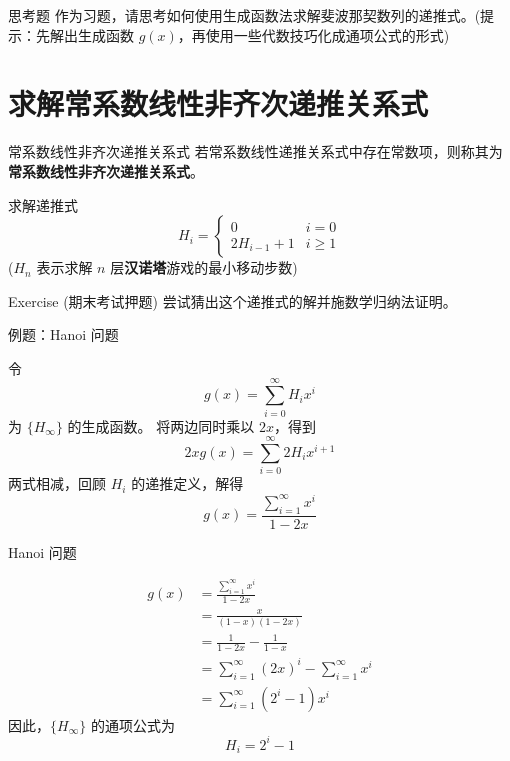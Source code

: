 \documentclass{beamer}
\begin{document}
\begin{frame}{思考题}
    作为习题，请思考如何使用生成函数法求解斐波那契数列的递推式。(提示：先解出生成函数 $g(x)$，再使用一些代数技巧化成通项公式的形式)
\end{frame}

\section{求解常系数线性非齐次递推关系式}

\begin{frame}{常系数线性非齐次递推关系式}
    若常系数线性递推关系式中存在常数项，则称其为\textbf{常系数线性非齐次递推关系式}。
    \pause
    \begin{example}[Hanoi 问题]
        求解递推式
        \begin{displaymath}
            H_i = \begin{cases} 
                0 & i=0\\
                2H_{i-1} + 1 & i\geqslant 1
              \end{cases}
        \end{displaymath}
        ($H_n$ 表示求解 $n$ 层\textbf{汉诺塔}游戏的最小移动步数)
    \end{example}
    \pause
    \begin{block}{Exercise (期末考试押题)}
        尝试猜出这个递推式的解并施数学归纳法证明。
    \end{block}
\end{frame}

\begin{frame}{例题：Hanoi 问题}
    \begin{solution}
        令 
        $$
        g(x) = \sum_{i=0}^\infty H_ix^i
        $$ 
        为 $\{H_\infty\}$ 的生成函数。
        \pause
        将两边同时乘以 $2x$，得到
        $$
        2xg(x) = \sum_{i=0}^\infty 2H_ix^{i+1}
        $$
        \pause
        两式相减，回顾 $H_i$ 的递推定义，解得
        $$
            g(x) = \frac{\sum_{i=1}^\infty x^i}{1-2x}
        $$
    \end{solution}
\end{frame}

\begin{frame}{Hanoi 问题}
    \begin{solution}
        \begin{displaymath}
            \begin{aligned}
                g(x) &= \frac{\sum_{i=1}^\infty x^i}{1-2x} \\
                &= \frac{x}{(1-x)(1-2x)}\\
                &= \frac{1}{1-2x} - \frac{1}{1-x}\\
                &= \sum_{i=1}^\infty (2x)^i - \sum_{i=1}^\infty x^i\\
                &= \sum_{i=1}^\infty (2^i - 1)x^i
            \end{aligned}
        \end{displaymath}
        因此，$\{H_\infty\}$ 的通项公式为
        $$
            H_i = 2^i - 1
        $$
    \end{solution}
\end{frame}
\end{document}
